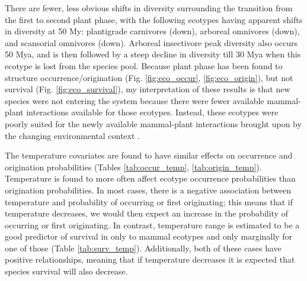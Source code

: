 There are fewer, less obvious shifts in diversity surrounding the transition from the first to second plant phase, with the following ecotypes having apparent shifts in diversity at 50 My: plantigrade carnivores (down), arboreal omnivores (down), and scansorial omnivores (down). Arboreal insectivore peak diversity also occurs 50 Mya, and is then followed by a steep decline in diversity till 30 Mya when this ecotype is lost from the species pool. Because plant phase has been found to structure occurrence/origination (Fig. \ref{fig:eco_occur}, \ref{fig:eco_origin}), but not survival (Fig. \ref{fig:eco_survival}), my interpretation of these results is that new species were not entering the system because there were fewer available mammal-plant interactions available for those ecotypes. Instead, these ecotypes were poorly suited for the newly available mammal-plant interactions brought upon by the changing environmental context \citep{Graham2011a}.

The temperature covariates are found to have similar effects on occurrence and origination probabilities (Tables \ref{tab:occur_temp}, \ref{tab:origin_temp}). Temperature is found to more often affect ecotype occurrence probabilities than origination probabilities. In most cases, there is a negative association between temperature and probability of occurring or first originating; this means that if temperature decreases, we would then expect an increase in the probability of occurring or first originating. In contrast, temperature range is estimated to be a good predictor of survival in only to mammal ecotypes and only marginally for one of those (Table \ref{tab:surv_temp}). Additionally, both of these cases have positive relationships, meaning that if temperature decreases it is expected that species survival will also decrease. 

